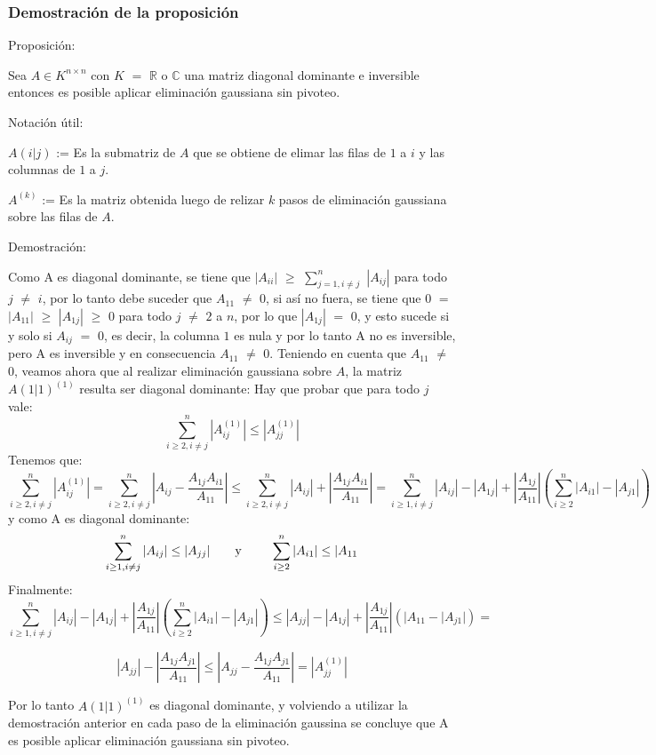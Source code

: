 \subsubsection{Demostración de la proposición}
Proposición:

Sea $A \in K^{n \times n}$ con $K$ $=$ $\mathbb{R}$ o $\mathbb{C}$ una matriz diagonal dominante e inversible entonces es posible aplicar eliminación gaussiana sin pivoteo.

Notación útil: 

$A(i|j)$ := Es la submatriz de $A$ que se obtiene de elimar las filas de $1$ a $i$ y las columnas de $1$ a $j$.

$A^{(k)}$ := Es la matriz obtenida luego de relizar $k$ pasos de eliminación gaussiana sobre las filas de $A$.

Demostración:

Como A es diagonal dominante, se tiene que $|A_{ii}|$ $\geq$ $\sum_{j=1, i \neq j}^{n}$ $|A_{ij}|$ para todo $j$ $\neq$ $i$, por lo tanto debe suceder que $A_{11}$ $\neq$ $0$, si así no fuera, se tiene que $0$ $=$ $|A_{11}|$ $\geq$ $|A_{1j}|$  $\geq$ $0$ para todo $j$ $\neq$ $2$ a $n$, por lo que $|A_{1j}|$ $=$ $0$, y esto sucede si y solo si $A_{ij}$ $=$ $0$, es decir, la columna $1$ es nula y por lo tanto A no es inversible, pero A es inversible y en consecuencia $A_{11}$ $\neq$ $0$.
Teniendo en cuenta que $A_{11}$ $\neq$ $0$, veamos ahora que al realizar eliminación gaussiana sobre $A$, la matriz $A(1|1)^{(1)}$ resulta ser diagonal dominante:
Hay que probar que para todo $j$ vale:
\[
\sum_{i \geq 2, i \neq j}^{n}|A_{ij}^{(1)}| \leq  |A_{jj}^{(1)}| 
\]
Tenemos que:
\[
\sum_{i \geq 2, i \neq j}^{n} |A_{ij}^{(1)}| =  \sum_{i \geq 2, i \neq j}^{n} |A_{ij} - \frac{A_{1j}A_{i1}}{A_{11}}| \leq 
\sum_{i \geq 2, i \neq j}^{n} |A_{ij}| + |\frac{A_{1j}A_{i1}}{A_{11}}| =
\sum_{i \geq 1, i \neq j}^{n} |A_{ij}| - |A_{1j}| + |\frac{A_{1j}}{A_{11}}|(\sum_{i \geq 2}^{n} |A_{i1}| - |A_{j1}|)
\]
y como A es diagonal dominante:
\[
\sum_{i \geq 1, i \neq j}^{n} |A_{ij}| \leq |A_{jj}| \text{\qquad y \qquad} \sum_{i \geq 2}^{n} |A_{i1}| \leq |A_{11}
\]
Finalmente:
\[
\sum_{i \geq 1, i \neq j}^{n} |A_{ij}| - |A_{1j}| + |\frac{A_{1j}}{A_{11}}|(\sum_{i \geq 2}^{n} |A_{i1}| - |A_{j1}|) \leq
|A_{jj}| - |A_{1j}| + |\frac{A_{1j}}{A_{11}}|(|A_{11} - |A_{j1}|) =
\]

\[
|A_{jj}| - |\frac{A_{1j}A_{j1}}{A_{11}}| \leq
|A_{jj} - \frac{A_{1j}A_{j1}}{A_{11}}| = |A_{jj}^{(1)}|
\]

Por lo tanto $A(1|1)^{(1)}$ es diagonal dominante, y volviendo a utilizar la demostración anterior en cada paso de la eliminación gaussina se concluye que A es posible aplicar eliminación gaussiana sin pivoteo.

